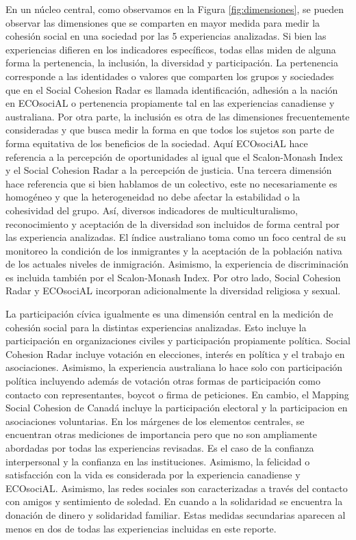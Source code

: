 \documentclass[
  12pt,
]{book}
\begin{document}
En un núcleo central, como observamos en la Figura \ref{fig:dimensiones}, se pueden observar las dimensiones que se comparten en mayor medida para medir la cohesión social en una sociedad por las 5 experiencias analizadas. Si bien las experiencias difieren en los indicadores específicos, todas ellas miden de alguna forma la pertenencia, la inclusión, la diversidad y participación. La pertenencia corresponde a las identidades o valores que comparten los grupos y sociedades que en el Social Cohesion Radar es llamada identificación, adhesión a la nación en ECOsociAL o pertenencia propiamente tal en las experiencias canadiense y australiana. Por otra parte, la inclusión es otra de las dimensiones frecuentemente consideradas y que busca medir la forma en que todos los sujetos son parte de forma equitativa de los beneficios de la sociedad. Aquí ECOsociAL hace referencia a la percepción de oportunidades al igual que el Scalon-Monash Index y el Social Cohesion Radar a la percepción de justicia. Una tercera dimensión hace referencia que si bien hablamos de un colectivo, este no necesariamente es homogéneo y que la heterogeneidad no debe afectar la estabilidad o la cohesividad del grupo. Así, diversos indicadores de multiculturalismo, reconocimiento y aceptación de la diversidad son incluidos de forma central por las experiencia analizadas. El índice australiano toma como un foco central de su monitoreo la condición de los inmigrantes y la aceptación de la población nativa de los actuales niveles de inmigración. Asimismo, la experiencia de discriminación es incluida también por el Scalon-Monash Index. Por otro lado, Social Cohesion Radar y ECOsociAL incorporan adicionalmente la diversidad religiosa y sexual.

La participación cívica igualmente es una dimensión central en la medición de cohesión social para la distintas experiencias analizadas. Esto incluye la participación en organizaciones civiles y participación propiamente política. Social Cohesion Radar incluye votación en elecciones, interés en política y el trabajo en asociaciones. Asimismo, la experiencia australiana lo hace solo con participación política incluyendo además de votación otras formas de participación como contacto con representantes, boycot o firma de peticiones. En cambio, el Mapping Social Cohesion de Canadá incluye la participación electoral y la participacion en asociaciones voluntarias. En los márgenes de los elementos centrales, se encuentran otras mediciones de importancia pero que no son ampliamente abordadas por todas las experiencias revisadas. Es el caso de la confianza interpersonal y la confianza en las instituciones. Asimismo, la felicidad o satisfacción con la vida es considerada por la experiencia canadiense y ECOsociAL. Asimismo, las redes sociales son caracterizadas a través del contacto con amigos y sentimiento de soledad. En cuando a la solidaridad se encuentra la donación de dinero y solidaridad familiar. Estas medidas secundarias aparecen al menos en dos de todas las experiencias incluidas en este reporte.
\end{document}
